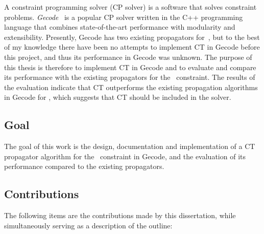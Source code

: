 \documentclass[a4paper,11pt]{article}
\newcommand{\Table}{\Constraint{Table}}
\newcommand{\CTpaper}[0]{DBLP:conf/cp/DemeulenaereHLP16}
\numberwithin{equation}{section}
\begin{document}
A constraint programming solver (CP solver) is a software that solves constraint problems.
\emph{Gecode}~\cite{Gecode} is a popular CP solver written in the C++ programming language
that combines state-of-the-art performance with modularity and extensibility.
Presently, Gecode has two existing propagators for~\Table,
but to the best of my knowledge there have been no attempts to implement
CT in Gecode before this project, and thus its performance in Gecode was unknown.
The purpose of this thesis is therefore to implement CT in Gecode and to evaluate
and compare its performance with the existing propagators for
the \Table~constraint.
The results of the evaluation indicate that CT outperforms
the existing propagation algorithms in Gecode for \Table,
which suggests that CT should be included in the solver.


\subsection{Goal}
\label{intro:goal}
The goal of this work is the design, documentation and implementation
of a CT propagator algorithm for the \Table~constraint in Gecode,
and the evaluation of its performance compared to the existing propagators.

\subsection{Contributions}
\label{intro:contributions}

The following items are the contributions made by this dissertation,
while simultaneously serving as a description of the outline:
\end{document}
